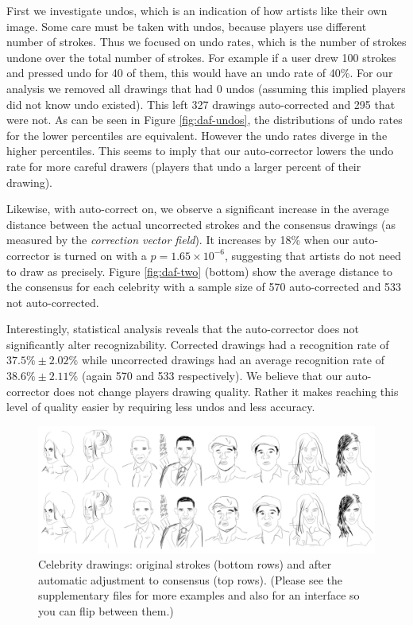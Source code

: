 
First we investigate undos, which is an indication of how artists like their own image. Some care must be taken with undos, because players use different number of strokes. Thus we focused on undo rates, which is the number of strokes undone over the total number of strokes. For example if a user drew 100 strokes and pressed undo for 40 of them, this would have an undo rate of 40\%. For our analysis we removed all drawings that had 0 undos (assuming this implied players did not know undo existed). This left 327 drawings auto-corrected and 295 that were not.  As can be seen in Figure \ref{fig:daf-undos}, the distributions of undo rates for the lower percentiles are equivalent. However the undo rates diverge in the higher percentiles. This seems to imply that our auto-corrector lowers the undo rate for more careful drawers (players that undo a larger percent of their drawing). 

Likewise, with auto-correct on,  we observe a significant increase in the average distance between the actual uncorrected strokes and the consensus drawings (as measured by the \emph{correction vector field}). It increases by 18\% when our auto-corrector is turned on with a $p=1.65\times10^{-6}$, suggesting that artists do not need to draw as precisely. Figure \ref{fig:daf-two} (bottom) show the average distance to the consensus for each celebrity with a sample size of 570 auto-corrected and 533 not auto-corrected.

Interestingly, statistical analysis reveals that the auto-corrector does not significantly alter recognizability. Corrected drawings had a recognition rate of $37.5\% \pm 2.02\%$ while uncorrected drawings had an average recognition rate of $38.6\% \pm 2.11\%$ (again 570 and 533 respectively). We believe that our auto-corrector does not change players drawing quality. Rather it makes reaching this level of quality easier by requiring less undos and less accuracy.



\begin{figure}[!t]
  \centering%
\includegraphics[width=7in]{./figures/ResultsAll_16.pdf}
\vspace{-0.35in}
  \caption{Celebrity drawings: original strokes (bottom rows) and after automatic adjustment to consensus (top rows). (Please see the supplementary files for more examples and also for an interface so you can flip between them.)}
\vspace{-0.25in}
  \label{fig:results}
\end{figure}
